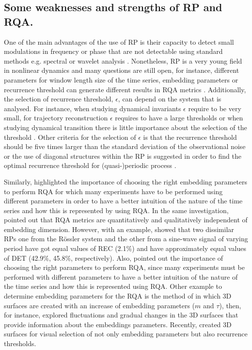 \subsection{Some weaknesses and strengths of RP and RQA.} \label{sec:ws_rqa}
One of the main advantages of the use of RP is their capacity to detect 
small modulations in frequency or phase that are not detectable using standard 
methods e.g. spectral or wavelet analysis \citep{marwan2011}.
Nonetheless, RP is a very young field in nonlinear dynamics
and many questions are still open, for instance, 
different parameters for window length size of the time series,
embedding parameters or recurrence threshold can generate different 
results in RQA metrics \citep{marwan2011, eckmann1987}.
Additionally, the selection of recurrence threshold, $\epsilon$, 
can depend on the system that is analysed. For instance, when studying 
dynamical invariants $\epsilon$ require to be very small, for trajectory 
reconstruction $\epsilon$ requires to have a large thresholds or 
when studying dynamical transition there is little importance about the 
selection of the threshold \citep{marwan2011}. Other criteria for the 
selection of $\epsilon$ is that the recurrence threshold should be five 
times larger than the standard deviation of the observational noise
or the use of diagonal structures within the RP is suggested in order
to find the optimal recurrence threshold for (quasi-)periodic process 
\citep{marwan2011}.



Similarly, \cite{iwanski1998} highlighted the importance of choosing 
the right embedding parameters to perform RQA for which many experiments 
have to be performed using different parameters in order to have a better 
intuition of the nature of the time series and how this is represented 
by using RQA. In the same investigation, \cite{iwanski1998} pointed out 
that RQA metrics are quantitatively and qualitatively independent of 
embedding dimension. However, with an example, \cite{iwanski1998} 
showed that two dissimilar RPs one from the R\"{o}ssler system and 
the other from a sine-wave signal of varying period have got equal 
values of REC (2.1\%) and have approximately equal values of 
DET (42.9\%, 45.8\%, respectively).
Also, \cite{iwanski1998} pointed out the importance of choosing the 
right parameters to perform RQA, since many experiments must be performed 
with different parameters to have a better intuition of the nature 
of the time series and how this is represented using RQA.
Other example to determine embedding parameters for the RQA 
is the method of \cite{zbilut1992} in which 3D surfaces are created 
with an increase of embedding parameters ($m$ and $\tau$), 
then, for instance, \cite{zbilut1992} explored fluctuations and gradual 
changes in the 3D surfaces that provide information about the embeddings 
parameters. Recently, \cite{marwan2015} created 3D surfaces for visual 
selection of not only embedding parameters but also recurrence thresholds.

